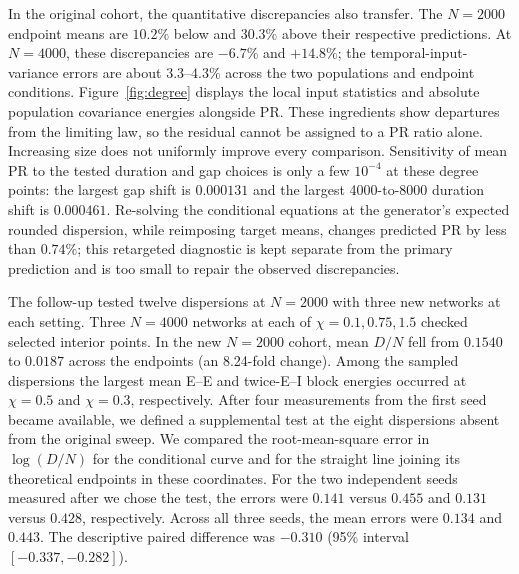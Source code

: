 In the original cohort, the quantitative discrepancies also transfer. The $N=2000$ endpoint means
are $10.2\%$ below and $30.3\%$ above their respective predictions.
At $N=4000$, these discrepancies are $-6.7\%$ and $+14.8\%$; the
temporal-input-variance errors are about $3.3$--$4.3\%$ across the two
populations and endpoint conditions.
Figure~\ref{fig:degree} displays the local input statistics and absolute
population covariance energies alongside PR. These ingredients show
departures from the limiting law, so the residual cannot be assigned to a
PR ratio alone. Increasing size does not uniformly improve every comparison.
Sensitivity of mean PR to the tested duration and gap choices is only a few
$10^{-4}$ at these degree points: the largest gap shift is $0.000131$ and
the largest 4000-to-8000 duration shift is $0.000461$. Re-solving the conditional equations at
the generator's expected rounded dispersion, while reimposing target means,
changes predicted PR by less than $0.74\%$; this retargeted diagnostic is
kept separate from the primary prediction and is too small to repair the
observed discrepancies.

The follow-up tested twelve dispersions at $N=2000$ with three new networks
at each setting. Three $N=4000$ networks at each of $\chi=0.1,0.75,1.5$
checked selected interior points. In the new $N=2000$ cohort, mean $D/N$
fell from $0.1540$ to $0.0187$ across the endpoints (an 8.24-fold change).
Among the sampled dispersions the largest mean E--E and twice-E--I block
energies occurred at $\chi=0.5$ and $\chi=0.3$, respectively. After four
measurements from the first seed became available, we defined a supplemental
test at the eight dispersions absent from the original sweep. We compared the
root-mean-square error in $\log(D/N)$ for the conditional curve and for the
straight line joining its theoretical endpoints in these coordinates. For
the two independent seeds measured after we chose the test, the errors were
$0.141$ versus $0.455$ and $0.131$ versus $0.428$, respectively. Across all
three seeds, the mean errors were $0.134$ and $0.443$. The descriptive paired
difference was $-0.310$ (95\% interval $[-0.337,-0.282]$).

